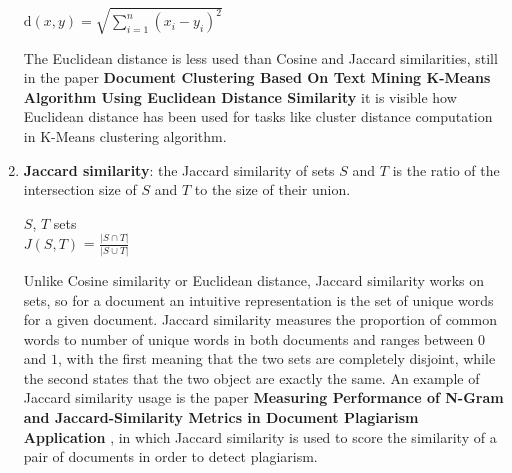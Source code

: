 \documentclass[\main/main.tex]{subfiles}
\begin{document}
\begin{enumerate}
    \begin{center}
        $\mathrm{d}(x, y) = \sqrt{\sum\limits_{i=1}^n (x_i-y_i)^2}$
    \end{center}
    The Euclidean distance is less used than Cosine and Jaccard similarities, still in the paper \textbf{Document Clustering Based On Text Mining K-Means Algorithm Using Euclidean Distance Similarity} \cite{Lydia2018DocumentCB} it is visible how Euclidean distance has been used for tasks like cluster distance computation in K-Means clustering algorithm.
    \item \textbf{Jaccard similarity}: the Jaccard similarity \cite{leskovec_rajaraman_ullman_2020}\cite{Gomaa2013ASO} of sets $S$ and $T$ is  the ratio of the intersection size of $S$ and $T$ to the size of their union.
    \begin{center}
        $S$, $T$ sets\\
        $J(S, T)$ = $\frac{| S \cap T|}{|S \cup T|}$
    \end{center}
    Unlike Cosine similarity or Euclidean distance, Jaccard similarity works on sets, so for a document an intuitive representation is the set of unique words for a given document. Jaccard similarity measures the proportion of common words to number of unique words in both documents and ranges between $0$ and $1$, with the first meaning that the two sets are completely disjoint, while the second states that the two object are exactly the same. An example of Jaccard similarity usage is the paper \textbf{Measuring Performance of N-Gram and Jaccard-Similarity Metrics in Document Plagiarism Application} \cite{Eka_Diana_2019}, in which Jaccard similarity is used to score the similarity of a pair of documents in order to detect plagiarism.
\end{enumerate}
\end{document}
